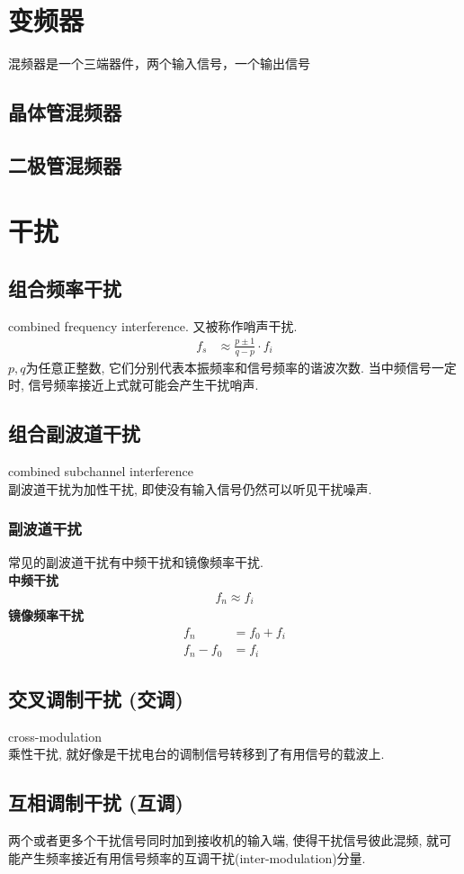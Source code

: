 \documentclass[a4paper]{report}
\begin{document}
\section{变频器}
混频器是一个三端器件，两个输入信号，一个输出信号
\subsection{晶体管混频器}
\subsection{二极管混频器}
\section{干扰}
\subsection{组合频率干扰}
combined frequency interference. 又被称作哨声干扰.
\begin{align*}
  f_s&\approx \frac{p\pm 1}{q-p}\cdot f_i
\end{align*}
$p,q$为任意正整数, 它们分别代表本振频率和信号频率的谐波次数.  
当中频信号一定时, 信号频率接近上式就可能会产生干扰哨声. 
\subsection{组合副波道干扰}
combined subchannel interference\\
副波道干扰为加性干扰, 即使没有输入信号仍然可以听见干扰噪声.
\subsubsection{副波道干扰}
常见的副波道干扰有中频干扰和镜像频率干扰.\\ 
\textbf{中频干扰}
\begin{align*}
  f_n\approx f_i
\end{align*} 
\textbf{镜像频率干扰}
\begin{align*}
  f_n&=f_0+f_i\\
  f_n-f_0&=f_i
\end{align*}
\subsection{交叉调制干扰 (交调)}
cross-modulation\\
乘性干扰, 就好像是干扰电台的调制信号转移到了有用信号的载波上. 
\subsection{互相调制干扰 (互调)}
两个或者更多个干扰信号同时加到接收机的输入端, 使得干扰信号彼此混频, 就可能产生频率接近有用信号频率的互调干扰(inter-modulation)分量. 
\end{document}
